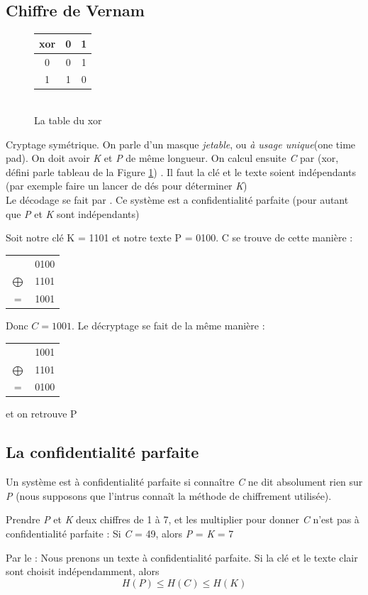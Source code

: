 \documentclass[11pt,a4paper]{article}
\begin{document}
\subsection{Chiffre de Vernam}
\begin{figure}
	\centering
	\captionsetup{justification=centering}
	\begin{tabular}{c|cc}
		xor & 0 & 1\\
		\hline
		0 & 0 & 1\\
		1 & 1 & 0
	\end{tabular}
	\caption{\\La table du xor}
	\label{xor}
\end{figure}
Cryptage symétrique. On parle d'un masque \textit{jetable}, ou \textit{à usage unique}(one time pad). On doit avoir \textit{K} et \textit{P} de même longueur. On calcul ensuite \textit{C} par  (xor, défini parle tableau de la Figure \ref{xor}) . Il faut la clé et le texte soient indépendants (par exemple faire un lancer de dés pour déterminer \textit{K})\\
Le décodage se fait par . Ce système est a confidentialité parfaite (pour autant que \textit{P} et \textit{K} sont indépendants)
\begin{exemple}
Soit notre clé K = 1101 et notre texte P = 0100. C se trouve de cette manière :
\begin{tabular}{c c}
	& 0100\\
	$\bigoplus$ & 	1101\\
	\hline
	= & 1001
\end{tabular}
Donc $C = 1001$. Le décryptage se fait de la même manière : 
\begin{tabular}{c c}
	& 1001\\
	$\bigoplus$ & 	1101\\
	\hline
	= & 0100
\end{tabular} et on retrouve P 	
\end{exemple}
\subsection{La confidentialité parfaite}
Un système est à confidentialité parfaite si connaître \textit{C} ne dit absolument rien sur \textit{P} (nous supposons que l'intrus connaît la méthode de chiffrement utilisée). 
\begin{exemple}
	Prendre \textit{P} et \textit{K} deux chiffres de 1 à 7, et les multiplier pour donner \textit{C} n'est pas à confidentialité parfaite : Si \textit{C} = 49, alors \textit{P} = \textit{K} = 7
\end{exemple}
Par le  : Nous prenons un texte à confidentialité parfaite. Si la clé et le texte clair sont choisit indépendamment, alors 
\begin{equation*}
	H(P) \leq H(C) \leq H(K)
\end{equation*}
\end{document}
